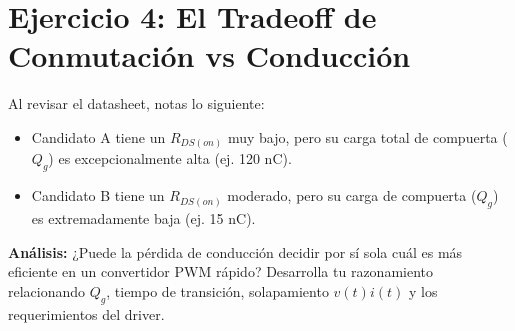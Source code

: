 \documentclass[11pt, a4paper]{article}
\begin{document}
\section*{Ejercicio 4: El Tradeoff de Conmutación vs Conducción}
Al revisar el datasheet, notas lo siguiente:
\begin{itemize}
    \item Candidato A tiene un $R_{DS(on)}$ muy bajo, pero su carga total de compuerta ($Q_g$) es excepcionalmente alta (ej. 120 nC).
    \item Candidato B tiene un $R_{DS(on)}$ moderado, pero su carga de compuerta ($Q_g$) es extremadamente baja (ej. 15 nC).
\end{itemize}
\textbf{Análisis:} ¿Puede la pérdida de conducción decidir por sí sola cuál es más eficiente en un convertidor PWM rápido? Desarrolla tu razonamiento relacionando $Q_g$, tiempo de transición, solapamiento $v(t)i(t)$ y los requerimientos del driver.
\end{document}
